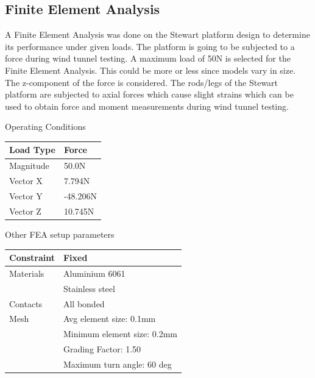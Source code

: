 \subsection{Finite Element Analysis}
A Finite Element Analysis was done on the Stewart platform design to determine its performance under given loads. The platform is going to be subjected to a force during wind tunnel testing. A maximum load of 50N is selected for the Finite Element Analysis. This could be more or less since models vary in size. The z-component of the force is considered.
The rods/legs of the Stewart platform are subjected to axial forces which cause slight strains which can be used to obtain force and moment measurements during wind tunnel testing.
\begin{center}
\begin{table}[H]
\caption{Operating Conditions}
\centering
\end{table}
\begin{tabular}{|l|l|}
\hline
\textbf{Load Type} & \textbf{Force}\\
\hline
Magnitude & 50.0N\\
\hline
Vector X & 7.794N\\
\hline
Vector Y & -48.206N\\
\hline
Vector Z & 10.745N\\
\hline
\end{tabular}
\end{center}

\begin{center}
\begin{table}[!h]
\caption[FEA Setup]{Other FEA setup parameters}
\centering
\end{table}
\begin{tabular}{|l|l|}
\hline
Constraint & Fixed\\
\hline
Materials & Aluminium 6061\\
 & Stainless steel\\
\hline
Contacts & All bonded\\
\hline
Mesh& Avg element size: 0.1mm\\
& Minimum element size: 0.2mm\\
& Grading Factor: 1.50\\
& Maximum turn angle: 60 deg\\
\hline
\end{tabular}
\end{center}
